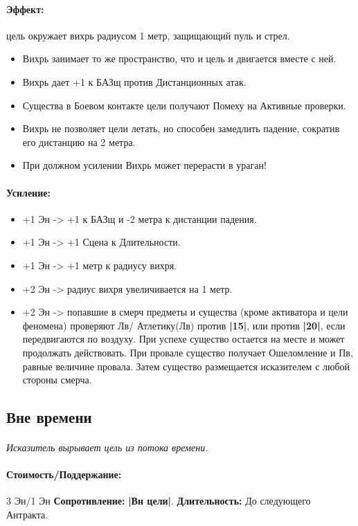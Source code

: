 \paragraph{Эффект: }цель окружает вихрь радиусом 1 метр, защищающий пуль и стрел. 
\begin{itemize} 
\item Вихрь занимает то же пространство, что и цель и двигается вместе с ней. 
\item Вихрь дает +1 к БАЗщ против Дистанционных атак. 
\item Существа в Боевом контакте цели получают Помеху на Активные проверки. 
\item Вихрь не позволяет цели летать, но способен замедлить падение, сократив его дистанцию на 2 метра. 
\item При должном усилении Вихрь может перерасти в ураган! 
\end{itemize}
\paragraph{Усиление:}
\begin{itemize}
\item+1 Эн -> +1 к БАЗщ и -2 метра к дистанции падения.
\item+1 Эн -> +1 Сцена к Длительности.
\item+1 Эн -> +1 метр к радиусу вихря.
\item+2 Эн -> радиус вихря увеличивается на 1 метр.
\item+2 Эн -> попавшие в смерч предметы и существа (кроме активатора и цели феномена) проверяют Лв/ Атлетику(Лв) против 
\textbf{|15|}, или против 
\textbf{|20|}, если передвигаются по воздуху. При успехе существо остается на месте и может продолжать действовать. При провале существо получает Ошеломление и Пв, равные величине провала. Затем существо размещается исказителем с любой стороны смерча.
\end{itemize}
\subsection{Вне времени}
\paragraph{} 
\textit{Исказитель вырывает цель из потока времени.}
\paragraph{Стоимость/Поддержание: }3 Эн/1 Эн
\newline
\textbf{Сопротивление: }
\textbf{|Вн цели|}.
\newline 
\textbf{Длительность: }До следующего Антракта.
